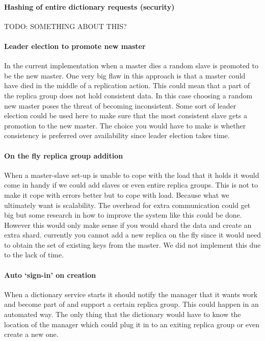 \documentclass[12pt,a4paper]{scrartcl}
\begin{document}
\paragraph{Hashing of entire dictionary requests (security)}
TODO: SOMETHING ABOUT THIS?

\paragraph{Leader election to promote new master}
In the current implementation when a master dies a random slave is promoted to be the new master. One very big flaw in this approach is that a master could have died in the middle of a replication action. This could mean that a part of the replica group does not hold consistent data. In this case choosing a random new master poses the threat of becoming inconsistent. Some sort of leader election could be used here to make sure that the most consistent slave gets a promotion to the new master. The choice you would have to make is whether consistency is preferred over availability since leader election takes time.

\paragraph{On the fly replica group addition}
When a master-slave set-up is unable to cope with the load that it holds it would come in handy if we could add slaves or even entire replica groups. This is not to make it cope with errors better but to cope with load. Because what we ultimately want is scalability. The overhead for extra communication could get big but some research in how to improve the system like this could be done. However this would only make sense if you would shard the data and create an extra shard. currently you cannot add a new replica on the fly since it would need to obtain the set of existing keys from the master. We did not implement this due to the lack of time.

\paragraph{Auto `sign-in' on creation}
When a dictionary service starts it should notify the manager that it wants work and become part of and support a certain replica group. This could happen in an automated way. The only thing that the dictionary would have to know the location of the manager which could plug it in to an exiting replica group or even create a new one.
\end{document}

